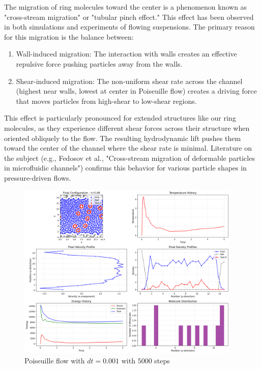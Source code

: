 The migration of ring molecules toward the center is a phenomenon known as "cross-stream migration" or "tubular pinch effect." This effect has been observed in both simulations and experiments of flowing suspensions. The primary reason for this migration is the balance between:
\begin{enumerate}
	\item Wall-induced migration: The interaction with walls creates an effective repulsive force pushing particles away from the walls.
	\item Shear-induced migration: The non-uniform shear rate across the channel (highest near walls, lowest at center in Poiseuille flow) creates a driving force that moves particles from high-shear to low-shear regions.
\end{enumerate}
This effect is particularly pronounced for extended structures like our ring molecules, as they experience different shear forces across their structure when oriented obliquely to the flow. The resulting hydrodynamic lift pushes them toward the center of the channel where the shear rate is minimal.
Literature on the subject (e.g., Fedosov et al., "Cross-stream migration of deformable particles in microfluidic channels") confirms this behavior for various particle shapes in pressure-driven flows.

\begin{figure}[H]
	\begin{center}
		\includegraphics[width=0.95\textwidth]{figures/poiseuille_vis_final.png}
	\end{center}
	\caption{Poiseuille flow with $dt=0.001$ with $5000$ steps}\label{fig:poiseuille}
\end{figure}

